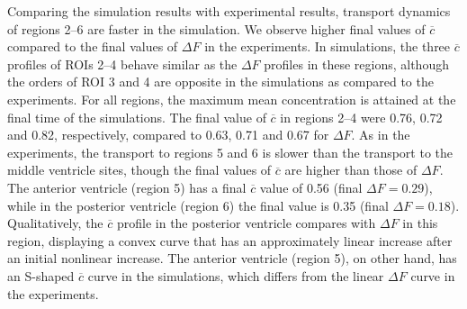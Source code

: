 \documentclass[fleqn]{wlscirep}
\begin{document}
Comparing the simulation results with experimental results, transport dynamics of regions 2--6 are faster in the simulation. We observe higher final values of $\overline{c}$ compared to the final values of $\Delta F$ in the experiments. In simulations, the three $\overline{c}$ profiles of ROIs 2--4 behave similar as the $\Delta F$ profiles in these regions, although the orders of ROI 3 and 4 are opposite in the simulations as compared to the experiments. For all regions, the maximum mean concentration is attained at the final time of the simulations. The final value of $\overline{c}$ in regions 2--4 were 0.76, 0.72 and 0.82, respectively, compared to 0.63, 0.71 and 0.67 for $\Delta F$. As in the experiments, the transport to regions 5 and 6 is slower than the transport to the middle ventricle sites, though the final values of $\overline{c}$ are higher than those of $\Delta F$. The anterior ventricle (region 5) has a final $\overline{c}$ value of 0.56 (final $\Delta F= 0.29$), while in the posterior ventricle (region 6) the final value is 0.35 (final $\Delta F= 0.18$). Qualitatively, the $\overline{c}$ profile in the posterior ventricle compares with $\Delta F$ in this region, displaying a convex curve that has an approximately linear increase after an initial nonlinear increase. The anterior ventricle (region 5), on other hand, has an S-shaped $\overline{c}$ curve in the simulations, which differs from the linear $\Delta F$ curve in the experiments. 
\end{document}
